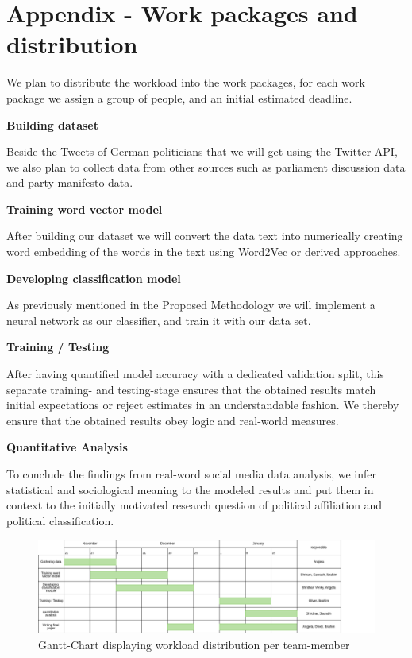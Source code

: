 \documentclass[10pt, oneside]{article}
\begin{document}
\section{Appendix - Work packages and distribution}

We plan to distribute the workload into the work packages, for each work package we assign a group of people, and an initial estimated deadline.

\begin{flushleft}
\textbf{Building dataset}

Beside the Tweets of German politicians that we will get using the Twitter API, we also plan to collect data from other sources such as parliament discussion data and party manifesto data.
\end{flushleft}

\begin{flushleft}
\textbf{Training word vector model}

After building our dataset we will convert the data text into numerically creating word embedding of the words in the text using Word2Vec or derived approaches.
\end{flushleft}

\begin{flushleft}
\textbf{Developing classification model}

As previously mentioned in the Proposed Methodology we will implement a neural network as our classifier, and train it with our data set.
\end{flushleft}

\begin{flushleft}
\textbf{Training / Testing}

After having quantified model accuracy with a dedicated validation split, this separate training- and testing-stage ensures that the obtained results match initial expectations or reject estimates in an understandable fashion. We thereby ensure that the obtained results obey logic and real-world measures.
\end{flushleft}

\begin{flushleft}
\textbf{Quantitative Analysis}

To conclude the findings from real-word social media data analysis, we infer statistical and sociological meaning to the modeled results and put them in context to the initially motivated research question of political affiliation and political classification.
\end{flushleft}

\begin{figure}
  \includegraphics[width=\textwidth]{gantt.png}
  \caption{Gantt-Chart displaying workload distribution per team-member}
\end{figure}




\end{document}
